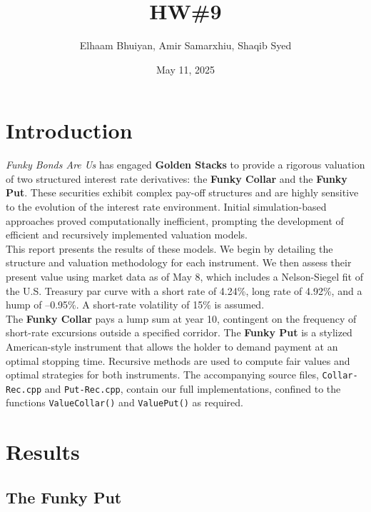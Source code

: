 \documentclass{report}
\title{HW\#9}
\author{
Elhaam Bhuiyan,
Amir Samarxhiu,
Shaqib Syed
}
\date{May 11, 2025}
\begin{document}
\maketitle

\section*{Introduction}

\textit{Funky Bonds Are Us} has engaged \textbf{Golden Stacks} to provide a rigorous valuation of two structured interest rate derivatives: the \textbf{Funky Collar} and the \textbf{Funky Put}. These securities exhibit complex pay-off structures and are highly sensitive to the evolution of the interest rate environment. Initial simulation-based approaches proved computationally inefficient, prompting the development of efficient and recursively implemented valuation models. \\

This report presents the results of these models. We begin by detailing the structure and valuation methodology for each instrument. We then assess their present value using market data as of May 8, which includes a Nelson-Siegel fit of the U.S. Treasury par curve with a short rate of 4.24\%, long rate of 4.92\%, and a hump of –0.95\%. A short-rate volatility of 15\% is assumed. \\

The \textbf{Funky Collar} pays a lump sum at year 10, contingent on the frequency of short-rate excursions outside a specified corridor. The \textbf{Funky Put} is a stylized American-style instrument that allows the holder to demand payment at an optimal stopping time. Recursive methods are used to compute fair values and optimal strategies for both instruments. The accompanying source files, \texttt{Collar-Rec.cpp} and \texttt{Put-Rec.cpp}, contain our full implementations, confined to the functions \texttt{ValueCollar()} and \texttt{ValuePut()} as required. \\

\newpage

\section*{Results}

\subsection*{The Funky Put}
\end{document}
